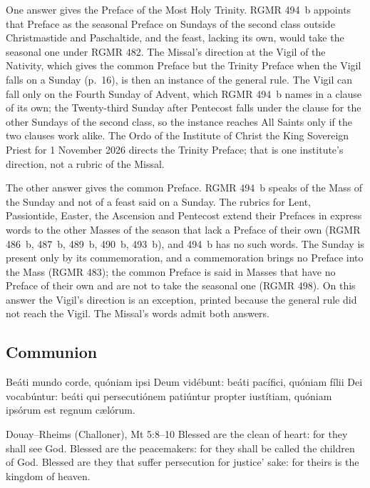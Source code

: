One answer gives the Preface of the Most Holy Trinity. RGMR 494~b appoints
that Preface as the seasonal Preface on Sundays of the second class outside
Christmastide and Paschaltide, and the feast, lacking its own, would take the
seasonal one under RGMR 482. The Missal's direction at the Vigil of the
Nativity, which gives the common Preface but the Trinity Preface when the
Vigil falls on a Sunday (p.~16), is then an instance of the general rule. The
Vigil can fall only on the Fourth Sunday of Advent, which RGMR 494~b names in a
clause of its own; the Twenty-third Sunday after Pentecost falls under the
clause for the other Sundays of the second class, so the instance reaches All
Saints only if the two clauses work alike. The Ordo of the Institute of Christ
the King Sovereign Priest for 1 November 2026 directs the Trinity Preface;
that is one institute's direction, not a rubric of the Missal.

The other answer gives the common Preface. RGMR 494~b speaks of the Mass of
the Sunday and not of a feast said on a Sunday. The rubrics for Lent,
Passiontide, Easter, the Ascension and Pentecost extend their Prefaces in
express words to the other Masses of the season that lack a Preface of their
own (RGMR 486~b, 487~b, 489~b, 490~b, 493~b), and 494~b has no such words. The
Sunday is present only by its commemoration, and a commemoration brings no
Preface into the Mass (RGMR 483); the common Preface is said in Masses that
have no Preface of their own and are not to take the seasonal one (RGMR 498).
On this answer the Vigil's direction is an exception, printed because the
general rule did not reach the Vigil. The Missal's words admit both answers.
\subsection{Communion}
\label{proper-communion}


\begin{latinproper}
Beáti mundo corde, quóniam ipsi Deum vidébunt: beáti pacífici, quóniam
fílii Dei vocabúntur: beáti qui persecutiónem patiúntur propter
iustítiam, quóniam ipsórum est regnum cælórum.
\end{latinproper}

\begin{englishwitness}{Douay--Rheims (Challoner), Mt 5:8--10}
Blessed are the clean of heart: for they shall see God. Blessed are the
peacemakers: for they shall be called the children of God. Blessed are they
that suffer persecution for justice' sake: for theirs is the kingdom of
heaven.
\end{englishwitness}

